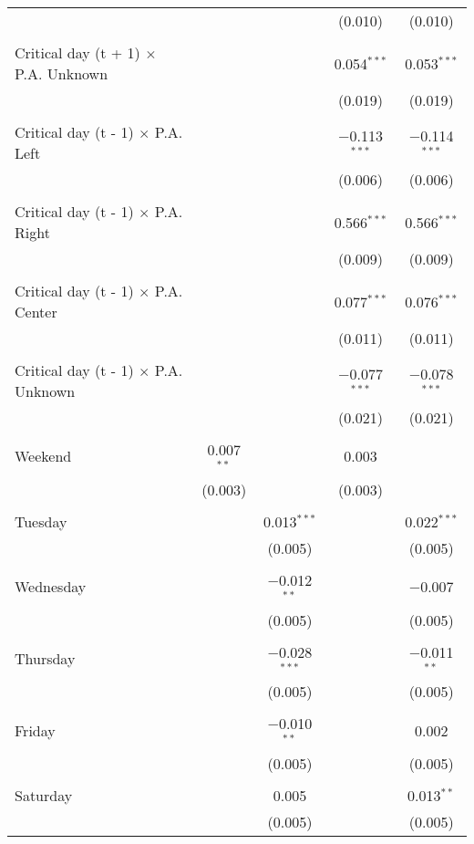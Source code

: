 \documentclass[
]{article}
\begin{document}
\begin{table}[!htbp]
{\begin{tabular}{@{\extracolsep{5pt}}lcccc}
  &  &  & (0.010) & (0.010) \\ 
  & & & & \\ 
 Critical day (t + 1) $\times$ P.A. Unknown &  &  & 0.054$^{***}$ & 0.053$^{***}$ \\ 
  &  &  & (0.019) & (0.019) \\ 
  & & & & \\ 
 Critical day (t - 1) $\times$ P.A. Left &  &  & $-$0.113$^{***}$ & $-$0.114$^{***}$ \\ 
  &  &  & (0.006) & (0.006) \\ 
  & & & & \\ 
 Critical day (t - 1) $\times$ P.A. Right &  &  & 0.566$^{***}$ & 0.566$^{***}$ \\ 
  &  &  & (0.009) & (0.009) \\ 
  & & & & \\ 
 Critical day (t - 1) $\times$ P.A. Center &  &  & 0.077$^{***}$ & 0.076$^{***}$ \\ 
  &  &  & (0.011) & (0.011) \\ 
  & & & & \\ 
 Critical day (t - 1) $\times$ P.A. Unknown &  &  & $-$0.077$^{***}$ & $-$0.078$^{***}$ \\ 
  &  &  & (0.021) & (0.021) \\ 
  & & & & \\ 
 Weekend & 0.007$^{**}$ &  & 0.003 &  \\ 
  & (0.003) &  & (0.003) &  \\ 
  & & & & \\ 
 Tuesday &  & 0.013$^{***}$ &  & 0.022$^{***}$ \\ 
  &  & (0.005) &  & (0.005) \\ 
  & & & & \\ 
 Wednesday &  & $-$0.012$^{**}$ &  & $-$0.007 \\ 
  &  & (0.005) &  & (0.005) \\ 
  & & & & \\ 
 Thursday &  & $-$0.028$^{***}$ &  & $-$0.011$^{**}$ \\ 
  &  & (0.005) &  & (0.005) \\ 
  & & & & \\ 
 Friday &  & $-$0.010$^{**}$ &  & 0.002 \\ 
  &  & (0.005) &  & (0.005) \\ 
  & & & & \\ 
 Saturday &  & 0.005 &  & 0.013$^{**}$ \\ 
  &  & (0.005) &  & (0.005) \\ 

\end{tabular}}
\end{table}
\end{document}
